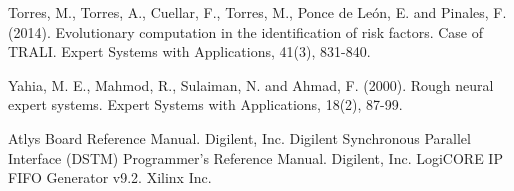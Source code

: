 \documentclass[authoryear,preprint,review,12pt]{elsarticle}
\begin{document}
\begin{thebibliography}{00}
Torres, M., Torres, A., Cuellar, F., Torres, M., Ponce de Le\'on, E. and Pinales, F. (2014). Evolutionary computation in the identification of risk factors. Case of TRALI. Expert Systems with Applications, 41(3), 831-840.

Yahia, M. E., Mahmod, R., Sulaiman, N. and Ahmad, F. (2000). Rough neural expert systems. Expert Systems with Applications, 18(2), 87-99.

Atlys Board Reference Manual. Digilent, Inc.
Digilent Synchronous Parallel Interface (DSTM) Programmer's Reference Manual. Digilent, Inc.
LogiCORE IP FIFO Generator v9.2. Xilinx Inc.


\end{thebibliography}
\end{document}

